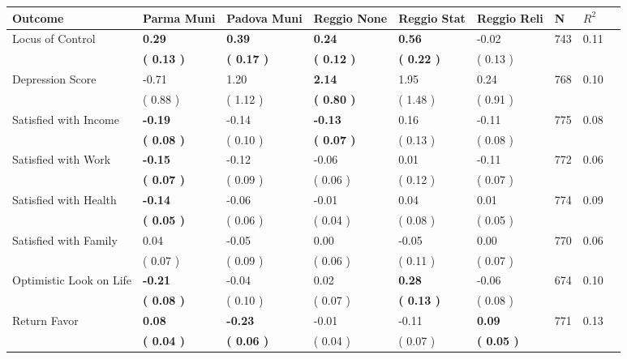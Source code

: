 \begin{tabular}{L{6.2cm} C{1.8cm} C{1.8cm} C{1.8cm} C{1.8cm} C{1.8cm} C{1.8cm} C{0.3cm} C{0.3cm}}
\toprule
 \textbf{Outcome} & \textbf{Parma Muni} & \textbf{Padova Muni} & \textbf{Reggio None} & \textbf{Reggio Stat} & \textbf{Reggio Reli} & \textbf{N} & \textbf{$ R^2$} \\
\midrule
Locus of Control & \textbf{     0.29} & \textbf{     0.39} & \textbf{     0.24} & \textbf{     0.56} &     -0.02  & 743 &       0.11 \\ 
 & \textbf{(     0.13 )} & \textbf{(     0.17 )} & \textbf{(     0.12 )} & \textbf{(     0.22 )} & (     0.13 )  & \\
Depression Score &     -0.71 &      1.20 & \textbf{     2.14} &      1.95 &      0.24  & 768 &       0.10 \\ 
 & (     0.88 ) & (     1.12 ) & \textbf{(     0.80 )} & (     1.48 ) & (     0.91 )  & \\
Satisfied with Income & \textbf{    -0.19} &     -0.14 & \textbf{    -0.13} &      0.16 &     -0.11  & 775 &       0.08 \\ 
 & \textbf{(     0.08 )} & (     0.10 ) & \textbf{(     0.07 )} & (     0.13 ) & (     0.08 )  & \\
Satisfied with Work & \textbf{    -0.15} &     -0.12 &     -0.06 &      0.01 &     -0.11  & 772 &       0.06 \\ 
 & \textbf{(     0.07 )} & (     0.09 ) & (     0.06 ) & (     0.12 ) & (     0.07 )  & \\
Satisfied with Health & \textbf{    -0.14} &     -0.06 &     -0.01 &      0.04 &      0.01  & 774 &       0.09 \\ 
 & \textbf{(     0.05 )} & (     0.06 ) & (     0.04 ) & (     0.08 ) & (     0.05 )  & \\
Satisfied with Family &      0.04 &     -0.05 &      0.00 &     -0.05 &      0.00  & 770 &       0.06 \\ 
 & (     0.07 ) & (     0.09 ) & (     0.06 ) & (     0.11 ) & (     0.07 )  & \\
Optimistic Look on Life & \textbf{    -0.21} &     -0.04 &      0.02 & \textbf{     0.28} &     -0.06  & 674 &       0.10 \\ 
 & \textbf{(     0.08 )} & (     0.10 ) & (     0.07 ) & \textbf{(     0.13 )} & (     0.08 )  & \\
Return Favor & \textbf{     0.08} & \textbf{    -0.23} &     -0.01 &     -0.11 & \textbf{     0.09}  & 771 &       0.13 \\ 
 & \textbf{(     0.04 )} & \textbf{(     0.06 )} & (     0.04 ) & (     0.07 ) & \textbf{(     0.05 )}  & \\

\end{tabular}
